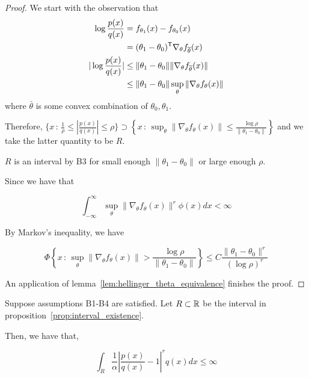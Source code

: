 \begin{proof}
We start with the observation that
\begin{align*}
\log \frac{p(x)}{q(x)} &= f_{\theta_1}(x) - f_{\theta_0}(x)\\
           &= (\theta_1 - \theta_0)^{\mathsf{T}} \nabla_{\theta} f_{\overline{\theta}} (x) \\
| \log \frac{p(x)}{q(x)} | &\leq \| \theta_1 - \theta_0 \| \| \nabla_{\theta} f_{\overline{\theta}} (x) \| \\
                &\leq  \| \theta_1 - \theta_0 \| \sup_\theta \| \nabla_{\theta} f_{\theta} (x) \|
\end{align*}
where $\bar{\theta}$ is some convex combination of $\theta_0, \theta_1$. 

Therefore,  
$ \{ x \,:\, \frac{1}{\rho} \leq \left| \frac{p(x)}{q(x)} \right| \leq \rho \} 
         \supset
   \left\{ x \,:\, \sup_\theta \| \nabla_{\theta} f_{\theta} (x) \| \leq \frac{\log \rho}{\| \theta_1 - \theta_0 \|} \right\}$ and we take the latter quantity to be $R$. 

$R$ is an interval by B3 for small enough $\| \theta_1 - \theta_0 \|$ or large enough $\rho$.

Since we have that

\[
 \int_{-\infty}^{\infty} \sup_\theta \| \nabla_{\theta} f_{\theta}(x) \|^{r} \phi(x) dx < \infty
\]


By Markov's inequality, we have

\[
\Phi \left\{ x \,:\, \sup_\theta \| \nabla_{\theta} f_{\theta}(x) \|  > \frac{\log \rho}{\| \theta_1 - \theta_0 \|} \right\}
    \leq C \frac{\| \theta_1 - \theta_0 \|^{r}}{(\log \rho)^{r}}
\]

An application of lemma~\ref{lem:hellinger_theta_equivalence} finishes the proof.

\end{proof}




\begin{proposition}
\label{prop:theta_A3_bound}
Suppose assumptions B1-B4 are satisfied. Let $R \subset {\mathbb R}$ be the interval in proposition~\ref{prop:interval_existence}.

Then, we have that,

\[
\int_R \frac{1}{\alpha} \left| \frac{p(x)}{q(x)} - 1 \right|^r q(x) dx \leq \infty
\]

\end{proposition}

